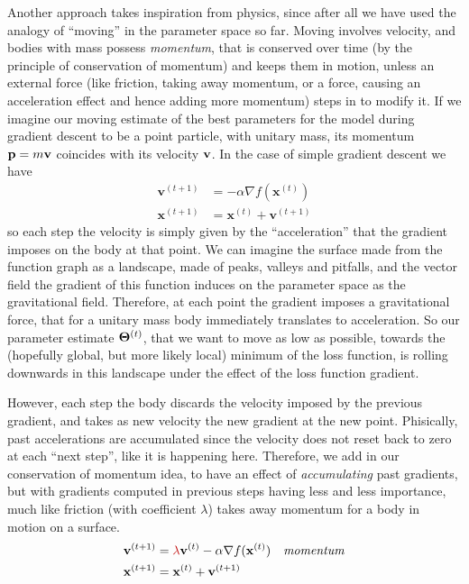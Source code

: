 
Another approach takes inspiration from physics, since after all we have used the analogy of ``moving'' in the parameter space so far. Moving involves velocity, and bodies with mass possess \emph{momentum}, that is conserved over time (by the principle of conservation of momentum) and keeps them in motion, unless an external force (like friction, taking away momentum, or a force, causing an acceleration effect and hence adding more momentum) steps in to modify it. If we imagine our moving estimate of the best parameters for the model during gradient descent to be a point particle, with unitary mass, its momentum $\vb{p} = m \vb{v}$ coincides with its velocity $\vb{v}$. In the case of simple gradient descent we have
\begin{equation}
    \begin{aligned}
        \mathbf{v}^{(t+1)} &=  - \alpha \nabla f( \mathbf{x}^{(t)}) \\
        \mathbf{x}^{(t+1)}  &= \mathbf{x}^{(t)} + \mathbf{v}^{(t+1)}
    \end{aligned}
\end{equation}
so each step the velocity is simply given by the ``acceleration'' that the gradient imposes on the body at that point. We can imagine the surface made from the function graph as a landscape, made of peaks, valleys and pitfalls, and the vector field the gradient of this function induces on the parameter space as the gravitational field. Therefore, at each point the gradient imposes a gravitational force, that for a unitary mass body immediately translates to acceleration. So our parameter estimate $\vb*{\Theta}^{(t)}$, that we want to move as low as possible, towards the (hopefully global, but more likely local) minimum of the loss function, is rolling downwards in this landscape under the effect of the loss function gradient. 

However, each step the body discards the velocity imposed by the previous gradient, and takes as new velocity the new gradient at the new point.
Phisically, past accelerations are accumulated since the velocity does not reset back to zero at each ``next step'', like it is happening here.
Therefore, we add in our conservation of momentum idea, to have an effect of \emph{accumulating} past gradients, but with gradients computed in previous steps having less and less importance, much like friction (with coefficient $\lambda$) takes away momentum for a body in motion on a surface.
\begin{equation}
    \begin{aligned}
        \mathbf{v}^{(t+1)} &=  {\color{red}\lambda} \mathbf{v}^{(t)} - \alpha \nabla f( \mathbf{x}^{(t)}) \quad\textrm{\emph{momentum}}\\
        \mathbf{x}^{(t+1)}  &= \mathbf{x}^{(t)} + \mathbf{v}^{(t+1)}
    \end{aligned}
\end{equation}


